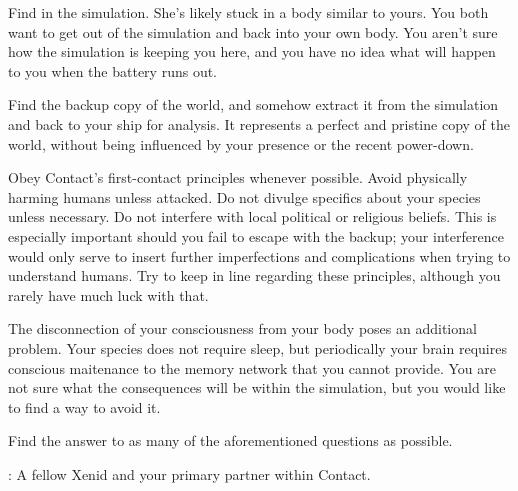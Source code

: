\documentclass[char]{guildcamp1}
\begin{document}
\begin{itemz}[Goals]
  \item Find \cActive{\name} in the simulation. She's likely stuck in a body similar to yours. You both want to get out of the simulation and back into your own body. You aren't sure how the simulation is keeping you here, and you have no idea what will happen to you when the battery runs out.
  \item Find the backup copy of the world, and somehow extract it from the simulation and back to your ship for analysis. It represents a perfect and pristine copy of the world, without being influenced by your presence or the recent power-down.
  \item Obey Contact's first-contact principles whenever possible. Avoid physically harming humans unless attacked. Do not divulge specifics about your species unless necessary. Do not interfere with local political or religious beliefs. This is especially important should you fail to escape with the backup; your interference would only serve to insert further imperfections and complications when trying to understand humans. Try to keep \cActive{\name} in line regarding these principles, although you rarely have much luck with that.
  \item The disconnection of your consciousness from your body poses an additional problem. Your species does not require sleep, but periodically your brain requires conscious maitenance to the memory network that you cannot provide. You are not sure what the consequences will be within the simulation, but you would like to find a way to avoid it. %
  \item Find the answer to as many of the aforementioned questions as possible.
  
\end{itemz}

\begin{contacts}
  \contact{\cActive{}}: A fellow Xenid and your primary partner within Contact.
\end{contacts}
\end{document}
